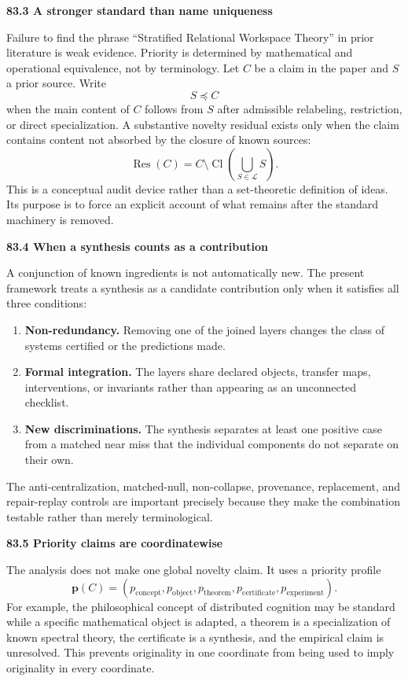 \documentclass[11pt,letterpaper]{article}
\newcommand{\subtopic}[1]{%
 \vspace{0.45em}
 {\bfseries\color{AccentColor} #1\par}
}
\theoremstyle{plain}
\theoremstyle{definition}
\begin{document}
\subtopic{83.3 A stronger standard than name uniqueness}

Failure to find the phrase ``Stratified Relational Workspace Theory'' in prior
literature is weak evidence. Priority is determined by mathematical and
operational equivalence, not by terminology. Let \(C\) be a claim in the
paper and \(S\) a prior source. Write
\[
S\preccurlyeq C
\]
when the main content of \(C\) follows from \(S\) after admissible relabeling,
restriction, or direct specialization. A substantive novelty residual exists
only when the claim contains content not absorbed by the closure of known
sources:
\[
\operatorname{Res}(C)
=
C\setminus
\operatorname{Cl}
\left(
\bigcup_{S\in\mathcal L}S
\right).
\]
This is a conceptual audit device rather than a set-theoretic definition of
ideas. Its purpose is to force an explicit account of what remains after the
standard machinery is removed.

\subtopic{83.4 When a synthesis counts as a contribution}

A conjunction of known ingredients is not automatically new. The present
framework treats a synthesis as a candidate contribution only when it satisfies
all three conditions:
\begin{enumerate}
\item \textbf{Non-redundancy.} Removing one of the joined layers changes the
 class of systems certified or the predictions made.
\item \textbf{Formal integration.} The layers share declared objects,
 transfer maps, interventions, or invariants rather than appearing as an
 unconnected checklist.
\item \textbf{New discriminations.} The synthesis separates at least one
 positive case from a matched near miss that the individual components do
 not separate on their own.
\end{enumerate}
The anti-centralization, matched-null, non-collapse, provenance, replacement,
and repair-replay controls are important precisely because they make the
combination testable rather than merely terminological.

\subtopic{83.5 Priority claims are coordinatewise}

The analysis does not make one global novelty claim. It uses a priority
profile
\[
\boxed{
\mathbf p(C)
=
\left(
 p_{\mathrm{concept}},
 p_{\mathrm{object}},
 p_{\mathrm{theorem}},
 p_{\mathrm{certificate}},
 p_{\mathrm{experiment}}
\right).
}
\]
For example, the philosophical concept of distributed cognition may be
standard while a specific mathematical object is adapted, a theorem is a
specialization of known spectral theory, the certificate is a synthesis, and
the empirical claim is unresolved. This prevents originality in one
coordinate from being used to imply originality in every coordinate.
\end{document}
